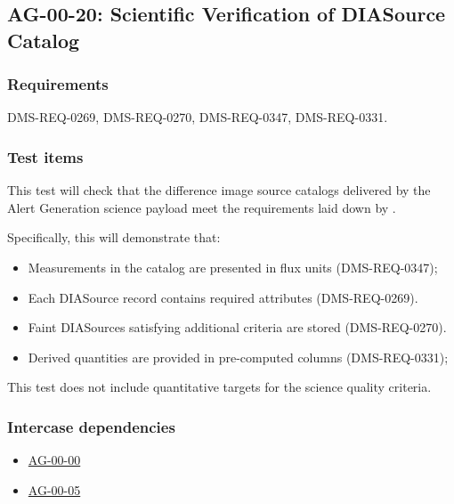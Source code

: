 \subsection{AG-00-20: Scientific Verification of DIASource Catalog}
\label{ag-00-20}

\subsubsection{Requirements}

DMS-REQ-0269, DMS-REQ-0270, DMS-REQ-0347, DMS-REQ-0331.

\subsubsection{Test items}
\label{ag-00-20-items}

This test will check that the difference image source catalogs 
delivered by the Alert Generation science
payload meet the requirements laid down by .

Specifically, this will demonstrate that:

\begin{itemize}

  \item{Measurements in the catalog are presented in flux units (DMS-REQ-0347);} 
\item{Each DIASource record contains required attributes
	(DMS-REQ-0269).}

\item{Faint DIASources satisfying additional criteria are stored
	(DMS-REQ-0270).}

  \item{Derived quantities are provided in pre-computed columns (DMS-REQ-0331);} 

\end{itemize}

This test does not include quantitative targets for the science quality criteria.

\subsubsection{Intercase dependencies}

\begin{itemize}

  \item{\hyperref[ag-00-00]{AG-00-00}}
  \item{\hyperref[ag-00-05]{AG-00-05}}

\end{itemize}

